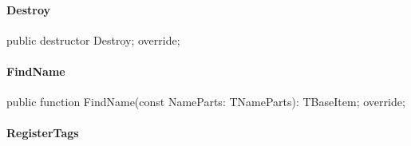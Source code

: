 \documentclass{report}
\newif\ifpdf
\begin{document}
\paragraph*{Destroy}\hspace*{\fill}

\label{PasDoc_Items.TPasItem-Destroy}
\begin{list}{}{
\setlength{\itemindent}{0cm}
\setlength{\listparindent}{0cm}
\setlength{\leftmargin}{\evensidemargin}
\addtolength{\leftmargin}{\tmplength}
\settowidth{\labelsep}{X}
\addtolength{\leftmargin}{\labelsep}
\setlength{\labelwidth}{\tmplength}
}
\item[\textbf{Declaration}\hfill]
\ifpdf
\begin{flushleft}
\fi
\begin{ttfamily}
public destructor Destroy; override;\end{ttfamily}

\ifpdf
\end{flushleft}
\fi

\end{list}
\paragraph*{FindName}\hspace*{\fill}

\label{PasDoc_Items.TPasItem-FindName}
\begin{list}{}{
\setlength{\itemindent}{0cm}
\setlength{\listparindent}{0cm}
\setlength{\leftmargin}{\evensidemargin}
\addtolength{\leftmargin}{\tmplength}
\settowidth{\labelsep}{X}
\addtolength{\leftmargin}{\labelsep}
\setlength{\labelwidth}{\tmplength}
}
\item[\textbf{Declaration}\hfill]
\ifpdf
\begin{flushleft}
\fi
\begin{ttfamily}
public function FindName(const NameParts: TNameParts): TBaseItem; override;\end{ttfamily}

\ifpdf
\end{flushleft}
\fi

\end{list}
\paragraph*{RegisterTags}\hspace*{\fill}
\end{document}
